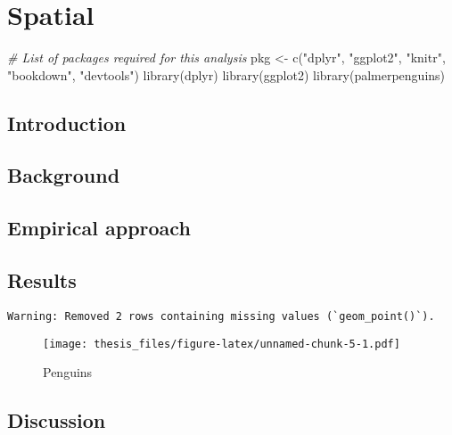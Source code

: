 \documentclass[twoside,12pt,final]{ucthesis-CA2012}
\newenvironment{Shaded}{}{}
\newcommand{\StringTok}[1]{\textcolor[rgb]{0.25,0.44,0.63}{{#1}}}
\newcommand{\CommentTok}[1]{\textcolor[rgb]{0.38,0.63,0.69}{\textit{{#1}}}}
\newcommand{\OtherTok}[1]{\textcolor[rgb]{0.00,0.44,0.13}{{#1}}}
\newcommand{\FunctionTok}[1]{\textcolor[rgb]{0.02,0.16,0.49}{{#1}}}
\newcommand{\NormalTok}[1]{{#1}}
\begin{document}
\begin{ucmainmatter}
\hypertarget{spatial}{%
\chapter{Spatial}\label{spatial}}

\begin{Shaded}
\begin{Highlighting}[]
\CommentTok{\# List of packages required for this analysis}
\NormalTok{pkg }\OtherTok{\textless{}{-}} \FunctionTok{c}\NormalTok{(}\StringTok{"dplyr"}\NormalTok{, }\StringTok{"ggplot2"}\NormalTok{, }\StringTok{"knitr"}\NormalTok{, }\StringTok{"bookdown"}\NormalTok{, }\StringTok{"devtools"}\NormalTok{)}
\FunctionTok{library}\NormalTok{(dplyr)}
\FunctionTok{library}\NormalTok{(ggplot2)}
\FunctionTok{library}\NormalTok{(palmerpenguins)}
\end{Highlighting}
\end{Shaded}
\hypertarget{introduction-2}{%
\section{Introduction}\label{introduction-2}}

\hypertarget{background-1}{%
\section{Background}\label{background-1}}

\hypertarget{empirical-approach-1}{%
\section{Empirical approach}\label{empirical-approach-1}}

\hypertarget{results-1}{%
\section{Results}\label{results-1}}
\begin{verbatim}
Warning: Removed 2 rows containing missing values (`geom_point()`).
\end{verbatim}
\begin{figure}
\centering
\texttt{[image: thesis\_files/figure-latex/unnamed-chunk-5-1.pdf]}
\caption{\label{fig:unnamed-chunk-5}Penguins}
\end{figure}
\hypertarget{discussion-1}{%
\section{Discussion}\label{discussion-1}}


\end{ucmainmatter}
\end{document}
